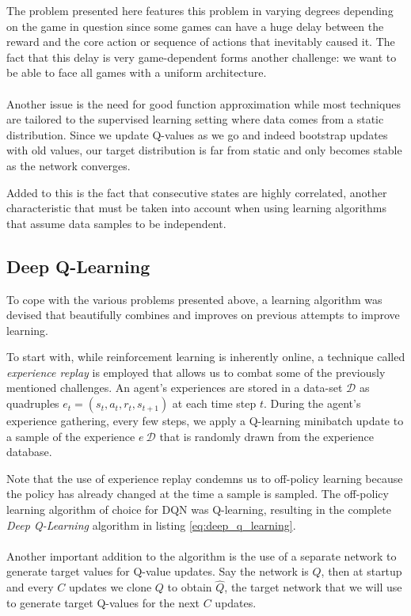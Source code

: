 The problem presented here features this problem
in varying degrees depending on the game in question
since some games can have a huge delay between
the reward and the core action or sequence of actions
that inevitably caused it.
The fact that this delay is very game-dependent
forms another challenge:
we want to be able to face all games with a uniform architecture.

\paragraph{}
Another issue is the need for good function approximation
while most techniques are tailored to the supervised learning setting
where data comes from a static distribution.
Since we update Q-values as we go
and indeed bootstrap updates with old values,
our target distribution is far from static and only becomes stable
as the network converges.

Added to this is the fact that consecutive states
are highly correlated,
another characteristic that must be taken into account
when using learning algorithms
that assume data samples to be independent.

\subsection{Deep Q-Learning}
\label{sub:deep_q_learning}
To cope with the various problems presented above,
a learning algorithm was devised that beautifully combines
and improves on previous attempts to improve learning.

To start with,
while reinforcement learning is inherently online,
a technique called \textit{experience replay} \parencite{lin1993}
is employed that allows us to combat some of the previously mentioned challenges.
An agent's experiences are stored in a data-set $\mathcal{D}$
as quadruples $e_t = (s_t, a_t, r_t, s_{t+1})$
at each time step $t$.
During the agent's experience gathering,
every few steps,
we apply a Q-learning minibatch update to a sample of the experience
$e ~ \mathcal{D}$
that is randomly drawn from the experience database.

Note that the use of experience replay condemns us to off-policy learning
because the policy has already changed at the time a sample is sampled.
The off-policy learning algorithm of choice for DQN
was Q-learning,
resulting in the complete \textit{Deep Q-Learning}
algorithm in listing \ref{eq:deep_q_learning}.

\paragraph{}
Another important addition to the algorithm
is the use of a separate network to generate target values
for Q-value updates.
Say the network is $Q$,
then at startup and every $C$ updates
we clone $Q$ to obtain $\hat{Q}$,
the target network that we will use to generate target Q-values
for the next $C$ updates.

